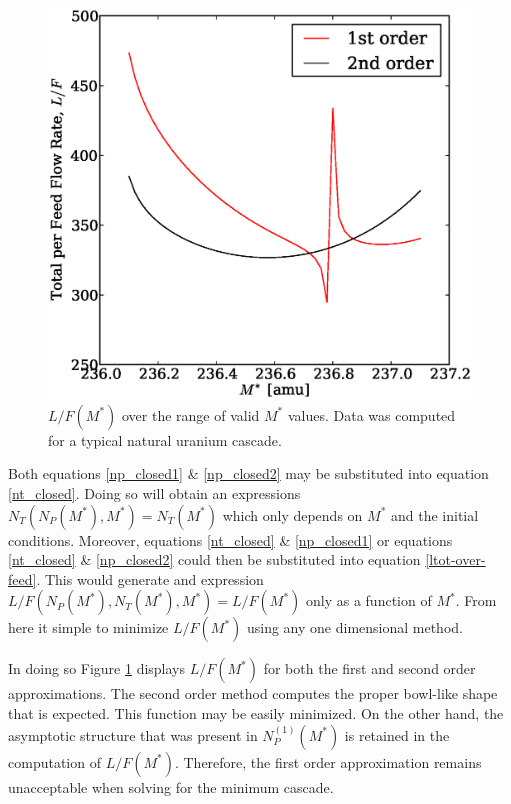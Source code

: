 \documentclass{ansconf}
\begin{document}
\begin{figure}[htpb]
\begin{center}
\includegraphics[scale=0.5]{loverf.eps}
\caption{$L/F(M^*)$ over the range of valid $M^*$ values.
Data was computed for a typical natural uranium cascade.}
\label{loverf_fig}
\end{center}
\end{figure}

Both equations \ref{np_closed1} \& \ref{np_closed2} may be substituted into 
equation \ref{nt_closed}.
Doing so will obtain an expressions $N_T(N_P(M^*),M^*)=N_T(M^*)$ which only depends on $M^*$ and 
the initial conditions.  Moreover, equations \ref{nt_closed} \& \ref{np_closed1} or 
equations \ref{nt_closed} \& \ref{np_closed2} could  then be substituted into 
equation \ref{ltot-over-feed}.   This would generate and expression 
$L/F(N_P(M^*),N_T(M^*),M^*)=L/F(M^*)$ only as a function of $M^*$.  From here it 
simple to minimize $L/F(M^*)$ using any one dimensional method.

In doing so
Figure \ref{loverf_fig} displays $L/F(M^*)$ for both the first and second order
approximations.  The second order method computes the proper bowl-like shape that is
expected.  This function may be easily minimized.  On the other hand, the asymptotic 
structure that was present in $N_P^{(1)}(M^*)$ is retained in the computation of 
$L/F(M^*)$.  Therefore, the first order approximation remains unacceptable when
solving for the minimum cascade.
\end{document}

